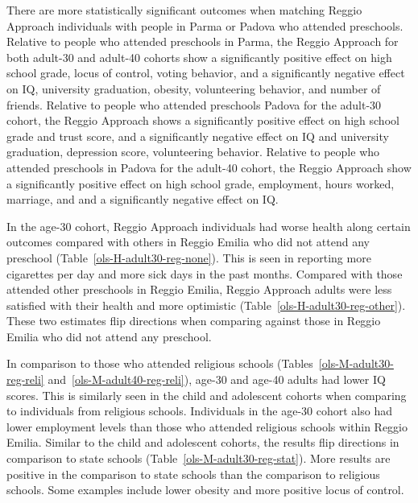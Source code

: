 There are more statistically significant outcomes when matching Reggio Approach individuals with people in Parma or Padova who attended preschools. Relative to people who attended preschools in Parma, the Reggio Approach for both adult-30 and adult-40 cohorts show a significantly positive effect on high school grade, locus of control, voting behavior, and a significantly negative effect on IQ, university graduation, obesity, volunteering behavior, and number of friends. Relative to people who attended preschools Padova for the adult-30 cohort, the Reggio Approach shows a significantly positive effect on high school grade and trust score, and a significantly negative effect on IQ and university graduation, depression score, volunteering behavior. Relative to people who attended preschools in Padova for the adult-40 cohort, the Reggio Approach show a significantly positive effect on high school grade, employment, hours worked, marriage, and  and a significantly negative effect on IQ.

In the age-30 cohort, Reggio Approach individuals had worse health along certain outcomes compared with others in Reggio Emilia who did not attend any preschool (Table~\ref{ols-H-adult30-reg-none}). This is seen in reporting more cigarettes per day and more sick days in the past months. Compared with those attended other preschools in Reggio Emilia, Reggio Approach adults were less satisfied with their health and more optimistic (Table~\ref{ols-H-adult30-reg-other}). These two estimates flip directions when comparing against those in Reggio Emilia who did not attend any preschool.

In comparison to those who attended religious schools (Tables~\ref{ols-M-adult30-reg-reli} and~\ref{ols-M-adult40-reg-reli}), age-30 and age-40 adults had lower IQ scores. This is similarly seen in the child and adolescent cohorts when comparing to individuals from religious schools. Individuals in the age-30 cohort also had lower employment levels than those who attended religious schools within Reggio Emilia. Similar to the child and adolescent cohorts, the results flip directions in comparison to state schools (Table~\ref{ols-M-adult30-reg-stat}). More results are positive in the comparison to state schools than the comparison to religious schools. Some examples include lower obesity and more positive locus of control.

